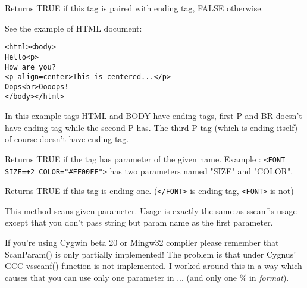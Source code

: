 Returns TRUE if this tag is paired with ending tag, FALSE otherwise.

See the example of HTML document:

\begin{verbatim}
<html><body>
Hello<p>
How are you?
<p align=center>This is centered...</p>
Oops<br>Oooops!
</body></html>
\end{verbatim}

In this example tags HTML and BODY have ending tags, first P and BR 
doesn't have ending tag while the second P has. The third P tag (which
is ending itself) of course doesn't have ending tag.

\label{wxhtmltaghasparam}


Returns TRUE if the tag has parameter of the given name. 
Example : {\tt <FONT SIZE=+2 COLOR="\#FF00FF">} has two parameters named
"SIZE" and "COLOR".



\label{wxhtmltagisending}


Returns TRUE if this tag is ending one.
({\tt </FONT>} is ending tag, {\tt <FONT>} is not)

\label{wxhtmltagscanparam}


This method scans given parameter. Usage is exactly the same as sscanf's 
usage except that you don't pass string but param name as the first parameter.





If you're using Cygwin beta 20 or Mingw32 compiler please remember
that ScanParam() is only partially implemented! The problem is
that under Cygnus' GCC vsscanf() function is not implemented. I worked around
this in a way which causes that you can use only one parameter in ...
(and only one \% in {\it format}).

